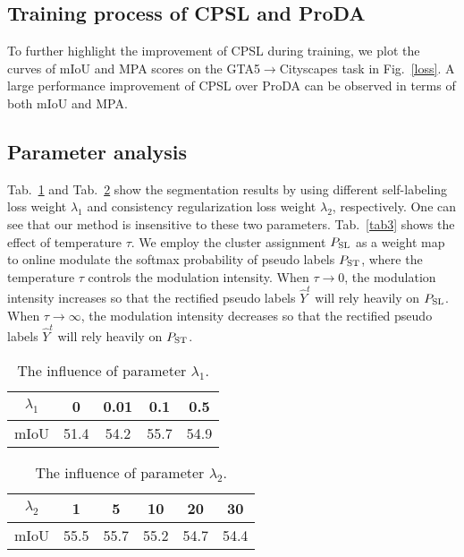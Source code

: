 \documentclass[10pt,twocolumn,letterpaper]{article}
\begin{document}
	
	
	\subsection{Training process of CPSL and ProDA}
	To further highlight the improvement of CPSL during training, we plot the curves of mIoU and MPA scores on the GTA5$\to$Cityscapes task in Fig.~\ref{loss}. A large performance improvement of CPSL over ProDA can be observed in terms of both mIoU and MPA.  
	
	
	\subsection{Parameter analysis}
	Tab.~\ref{tab1} and Tab.~\ref{tab2} show the segmentation results by using different self-labeling loss weight $\lambda_1$ and consistency regularization loss weight $\lambda_2$, respectively. One can see that our method is insensitive to these two parameters. Tab.~\ref{tab3} shows the effect of temperature $\tau$. We employ the cluster assignment $P_{\rm SL}$ as a weight map to online modulate the softmax probability of pseudo labels $P_{\rm ST}$, where the temperature $\tau$ controls the modulation intensity. When $\tau \to 0$, the modulation intensity increases so that the rectified pseudo labels $\hat{Y}^t$ will rely heavily on $P_{\rm SL}$. When $\tau \to \infty$, the modulation intensity decreases so that the rectified pseudo labels $\hat{Y}^t$ will rely heavily on $P_{\rm ST}$.
	\begin{table}[!h]
		\centering
		\begin{tabular}{ccccc}
			\hline
			$\lambda_1$ & 0    & 0.01 & 0.1  & 0.5  \\ \hline
			mIoU                      & 51.4 & 54.2 & 55.7 & 54.9 \\ \hline
		\end{tabular}
		\caption{The influence of parameter $\lambda_1$.}
		\label{tab1}
	\end{table}
	
	\begin{table}[!h]
		\centering
		\begin{tabular}{cccccc}
			\hline
			$\lambda_2$ & 1    & 5    & 10   & 20   & 30   \\ \hline
			mIoU       & 55.5 & 55.7 & 55.2 & 54.7 & 54.4 \\ \hline
		\end{tabular}
		\caption{The influence of parameter $\lambda_2$.}
		\label{tab2}
	\end{table}
	
\end{document}

